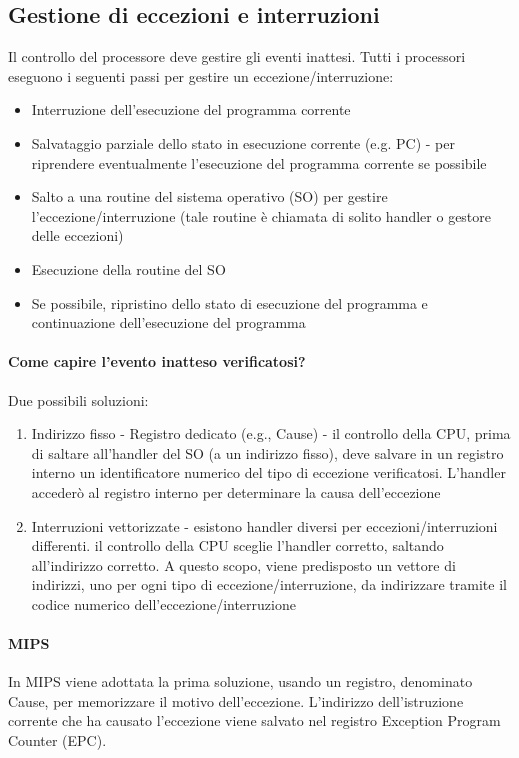 \documentclass[12pt, a4paper, openany]{book}
\begin{document}
\subsection{Gestione di eccezioni e interruzioni}
Il controllo del processore deve gestire gli eventi inattesi.
Tutti i processori eseguono i seguenti passi per gestire un eccezione/interruzione:
\begin{itemize}
    \item Interruzione dell'esecuzione del programma corrente
    \item Salvataggio parziale dello stato in esecuzione corrente (e.g. PC) - per
    riprendere eventualmente l'esecuzione del programma corrente se possibile
    \item Salto a una routine del sistema operativo (SO) per gestire l'eccezione/interruzione
    (tale routine è chiamata di solito handler o gestore delle eccezioni)
    \item Esecuzione della routine del SO
    \item Se possibile, ripristino dello stato di esecuzione del programma
    e continuazione dell'esecuzione del programma
\end{itemize}
\paragraph*{Come capire l'evento inatteso verificatosi?}
Due possibili soluzioni:
\begin{enumerate}
    \item Indirizzo fisso - Registro dedicato (e.g., Cause) - il controllo della CPU,
    prima di saltare all'handler del SO (a un indirizzo fisso), deve salvare in un registro
    interno un identificatore numerico del tipo di eccezione verificatosi.
    L'handler accederò al registro interno per determinare la causa dell'eccezione
    \item Interruzioni vettorizzate - esistono handler diversi per eccezioni/interruzioni differenti.
    il controllo della CPU sceglie l'handler corretto, saltando all'indirizzo corretto.
    A questo scopo, viene predisposto un vettore di indirizzi, uno per ogni tipo
    di eccezione/interruzione, da indirizzare tramite il codice numerico dell'eccezione/interruzione
\end{enumerate}
\paragraph*{MIPS} In MIPS viene adottata la prima soluzione, usando un registro, denominato
Cause, per memorizzare il motivo dell'eccezione. L'indirizzo dell'istruzione corrente che ha causato
l'eccezione viene salvato nel registro Exception Program Counter (EPC).
\end{document}
